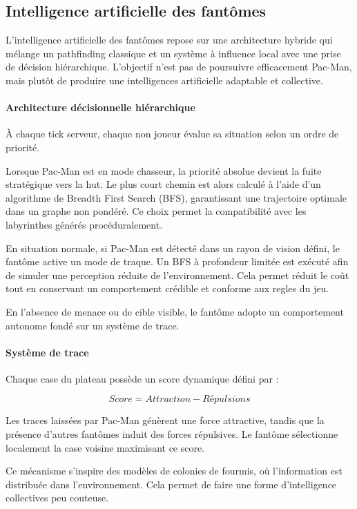 \documentclass[a4paper, 11pt]{article}
\begin{document}
\subsection{Intelligence artificielle des fantômes}

L’intelligence artificielle des fantômes repose sur une architecture hybride qui mélange un pathfinding classique et un système à influence local avec une prise de décision hiérarchique. 
L’objectif n’est pas de poursuivre efficacement Pac-Man, mais plutôt de produire une intelligences artificielle adaptable et collective.

\paragraph{Architecture décisionnelle hiérarchique}

À chaque tick serveur, chaque  non joueur évalue sa situation selon un ordre de priorité.

Lorsque Pac-Man est en mode chasseur, la priorité absolue devient la fuite stratégique vers la hut. 
Le plus court chemin est alors calculé à l’aide d’un algorithme de Breadth First Search (BFS), garantissant une trajectoire optimale dans un graphe non pondéré.
Ce choix permet la compatibilité avec les labyrinthes générés procéduralement.

En situation normale, si Pac-Man est détecté dans un rayon de vision défini, le fantôme active un mode de traque. 
Un BFS à profondeur limitée est exécuté afin de simuler une perception réduite de l’environnement. 
Cela permet réduit le coût tout en conservant un comportement crédible et conforme aux regles du jeu.

En l’absence de menace ou de cible visible, le fantôme adopte un comportement autonome fondé sur un système de trace.

\paragraph{Système de trace}

Chaque case du plateau possède un score dynamique défini par :

\[
Score = Attraction - Répulsions
\]

Les traces laissées par Pac-Man génèrent une force attractive, tandis que la présence d’autres fantômes induit des forces répulsives. 
Le fantôme sélectionne localement la case voisine maximisant ce score.

Ce mécanisme s’inspire des modèles de colonies de fourmis, où l’information est distribuée dans l’environnement. Cela permet de faire une forme d'intelligence collectives peu couteuse.
\end{document}
